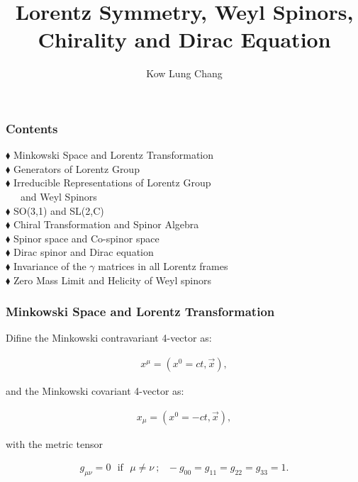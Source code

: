 \documentclass[12pt]{beamer}
\title{Lorentz Symmetry, Weyl Spinors, Chirality and Dirac Equation}
\author{Kow Lung Chang}
\institute{Physics Department, National Taiwan University}
\newcommand{\ptplus}[0]{\\[+5pt]}
\begin{document}
\begin{frame}
\titlepage
\end{frame}

\begin{frame}
\frametitle{Contents}
$\blacklozenge$ Minkowski Space and Lorentz Transformation \ptplus

$\blacklozenge$ Generators of Lorentz Group\ptplus

$\blacklozenge$ Irreducible Representations of Lorentz Group \\ ~~~and Weyl 
Spinors \ptplus

$\blacklozenge$ SO(3,1) and SL(2,C)\ptplus

$\blacklozenge$ Chiral Transformation and Spinor Algebra\ptplus

$\blacklozenge$ Spinor space and Co-spinor space\ptplus

$\blacklozenge$ Dirac spinor and Dirac equation\ptplus

$\blacklozenge$ Invariance of the $ \gamma $ matrices in all Lorentz frames\ptplus

$\blacklozenge$ Zero Mass Limit and Helicity of Weyl spinors\ptplus

\end{frame}

\begin{frame}
\frametitle{Minkowski Space and Lorentz Transformation}

Difine the Minkowski contravariant 4-vector as:

\begin{align}
x^\mu=(x^0=ct, \vec{x}),
\end{align}

\noindent and the Minkowski covariant 4-vector as:

\begin{align}
x_\mu=(x^0=-ct, \vec{x}),
\end{align}

\noindent with the metric tensor

\begin{align}
g_{\mu\nu}=0~~~\mbox{if}~~~ \mu\neq\nu~;~~~-g_{00}=g_{11}=g_{22}=g_{33}=1.
\end{align}
\end{frame}
\end{document}
